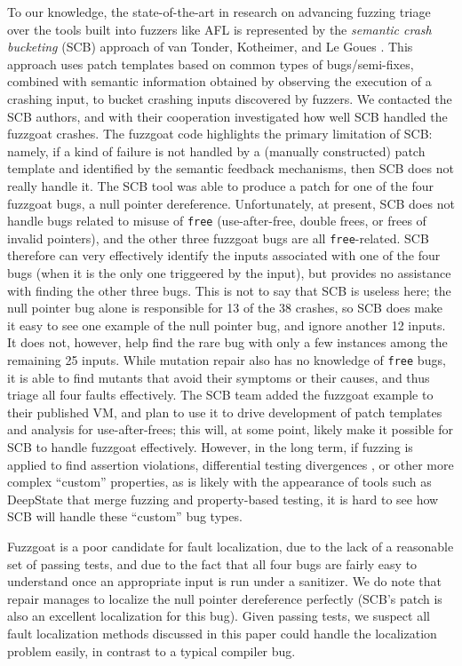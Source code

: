 To our knowledge, the state-of-the-art in research on advancing fuzzing triage over the tools built into fuzzers like AFL is represented by the \emph{semantic crash bucketing} (SCB) approach of van Tonder, Kotheimer, and Le Goues \cite{SCB}.  This approach uses patch templates based on common types of bugs/semi-fixes, combined with semantic information obtained by observing the execution of a crashing input, to bucket crashing inputs discovered by fuzzers.  We contacted the SCB authors, and with their cooperation investigated how well SCB handled the fuzzgoat crashes.  The fuzzgoat code highlights the primary limitation of SCB: namely, if a kind of failure is not handled by a (manually constructed) patch template and identified by the semantic feedback mechanisms, then SCB does not really handle it.  The SCB tool was able to produce a patch for one of the four fuzzgoat bugs, a null pointer dereference.  Unfortunately, at present, SCB does not handle bugs related to misuse of {\tt free} (use-after-free, double frees, or frees of invalid pointers), and the other three fuzzgoat bugs are all {\tt free}-related.  SCB therefore can very effectively identify the inputs associated with one of the four bugs (when it is the only one triggeered by the input), but provides no assistance with finding the other three bugs. This is not to say that SCB is useless here; the null pointer bug alone is responsible for 13 of the 38 crashes, so SCB does make it easy to see one example of the null pointer bug, and ignore another 12 inputs.  It does not, however, help find the rare bug with only a few instances among the remaining 25 inputs.  While mutation repair also has no knowledge of {\tt free} bugs, it is able to find mutants that avoid their symptoms or their causes, and thus triage all four faults effectively.   The SCB team added the fuzzgoat example to their published VM, and plan to use it to drive development of patch templates and analysis for use-after-frees; this will, at some point, likely make it possible for SCB to handle fuzzgoat effectively.  However, in the long term, if fuzzing is applied to find assertion violations, differential testing divergences \cite{Differential,ICSEDiff}, or other more complex ``custom'' properties, as is likely with the appearance of tools such as DeepState \cite{DeepState} that merge fuzzing and property-based testing, it is hard to see how SCB will handle these ``custom'' bug types.

Fuzzgoat is a poor candidate for fault localization, due to the lack of a reasonable set of passing tests, and due to the fact that all four bugs are fairly easy to understand once an appropriate input is run under a sanitizer.  We do note that repair manages to localize the null pointer dereference perfectly (SCB's patch is also an excellent localization for this bug).  Given passing tests, we suspect all fault localization methods discussed in this paper could handle the localization problem easily, in contrast to a typical compiler bug.

